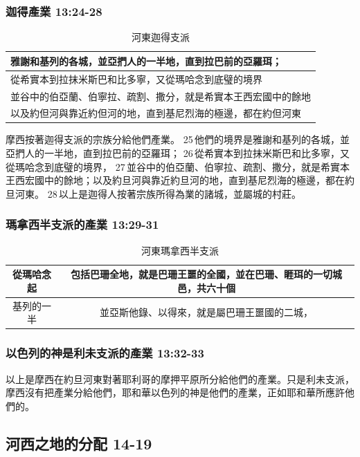 \subsubsection{迦得產業 13:24-28}
\begin{table}[!hbp]
\centering
\begin{tabular}{|p{15cm}|}
\hline
\hline
 雅謝和基列的各城，並亞捫人的一半地，直到拉巴前的亞羅珥； \\\hline
 從希實本到拉抹米斯巴和比多寧，又從瑪哈念到底璧的境界\\\hline
 並谷中的伯亞蘭、伯寧拉、疏割、撒分，就是希實本王西宏國中的餘地\\\hline
 以及約但河與靠近約但河的地，直到基尼烈海的極邊，都在約但河東\\\hline
 \end{tabular}
\caption{河東迦得支派}
\end{table}
摩西按著迦得支派的宗族分給他們產業。 25 他們的境界是雅謝和基列的各城，並亞捫人的一半地，直到拉巴前的亞羅珥； 26 從希實本到拉抹米斯巴和比多寧，又從瑪哈念到底璧的境界， 27 並谷中的伯亞蘭、伯寧拉、疏割、撒分，就是希實本王西宏國中的餘地；以及約旦河與靠近約旦河的地，直到基尼烈海的極邊，都在約旦河東。 28 以上是迦得人按著宗族所得為業的諸城，並屬城的村莊。

\subsubsection{瑪拿西半支派的產業 13:29-31}
\begin{table}[H]
\centering
\begin{tabular}{|c|c|}
\hline
\hline
 從瑪哈念起 &包括巴珊全地，就是巴珊王噩的全國，並在巴珊、睚珥的一切城邑，共六十個  \\\hline
 基列的一半 &並亞斯他錄、以得來，就是屬巴珊王噩國的二城，\\\hline
 \end{tabular}
\caption{河東瑪拿西半支派}
\end{table}

\subsubsection{以色列的神是利未支派的產業 13:32-33}
以上是摩西在約旦河東對著耶利哥的摩押平原所分給他們的產業。只是利未支派，摩西沒有把產業分給他們，耶和華以色列的神是他們的產業，正如耶和華所應許他們的。

\subsection{河西之地的分配 14-19 }
